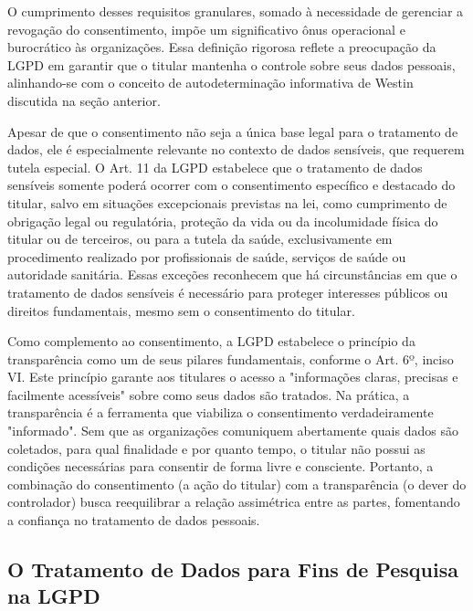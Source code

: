 O cumprimento desses requisitos granulares, somado à necessidade de gerenciar a revogação do consentimento, impõe um significativo ônus operacional e burocrático às organizações. Essa definição rigorosa reflete a preocupação da LGPD em garantir que o titular mantenha o controle sobre seus dados pessoais, alinhando-se com o conceito de autodeterminação informativa de Westin discutida na seção anterior.

Apesar de que o consentimento não seja a única base legal para o tratamento de dados, ele é especialmente relevante no contexto de dados sensíveis, que requerem tutela especial. O Art. 11 da LGPD estabelece que o tratamento de dados sensíveis somente poderá ocorrer com o consentimento específico e destacado do titular, salvo em situações excepcionais previstas na lei, como cumprimento de obrigação legal ou regulatória, proteção da vida ou da incolumidade física do titular ou de terceiros, ou para a tutela da saúde, exclusivamente em procedimento realizado por profissionais de saúde, serviços de saúde ou autoridade sanitária.
Essas exceções reconhecem que há circunstâncias em que o tratamento de dados sensíveis é necessário para proteger interesses públicos ou direitos fundamentais, mesmo sem o consentimento do titular.

Como complemento ao consentimento, a LGPD estabelece o princípio da transparência como um de seus pilares fundamentais, conforme o Art. 6º, inciso VI. Este princípio garante aos titulares o acesso a "informações claras, precisas e facilmente acessíveis" sobre como seus dados são tratados. Na prática, a transparência é a ferramenta que viabiliza o consentimento verdadeiramente "informado". Sem que as organizações comuniquem abertamente quais dados são coletados, para qual finalidade e por quanto tempo, o titular não possui as condições necessárias para consentir de forma livre e consciente. Portanto, a combinação do consentimento (a ação do titular) com a transparência (o dever do controlador) busca reequilibrar a relação assimétrica entre as partes, fomentando a confiança no tratamento de dados pessoais.

\subsection{O Tratamento de Dados para Fins de Pesquisa na LGPD}
\label{subsec:fund-pesquisa-lgpd}

